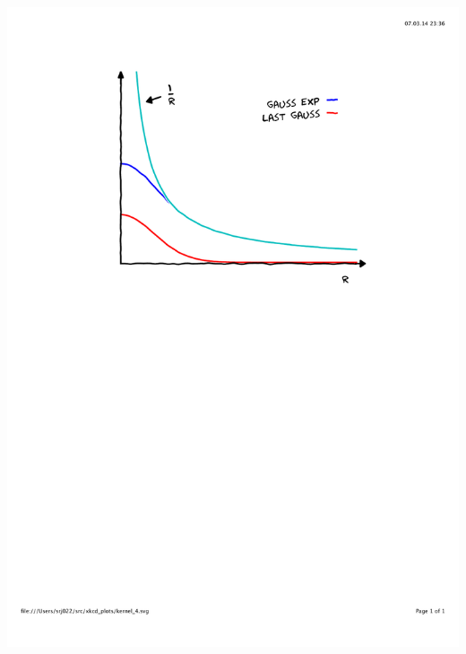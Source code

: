 \begin{frame}
\begin{columns}
\begin{column}{.50\textwidth}
{        \includegraphics[scale=0.4, clip, viewport = 110 450 490 800]
            {figures/kernel_4.pdf}}
\end{column}
\end{columns}
\end{frame}
